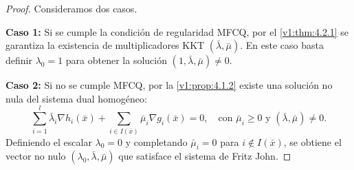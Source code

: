 \begin{proof}
 Consideramos dos casos.
 
 \textbf{Caso 1:} Si se cumple la condición de regularidad MFCQ, por el \cref{v1:thm:4.2.1} se garantiza la existencia de multiplicadores KKT $(\bar{\lambda}, \bar{\mu})$. En este caso basta definir $\lambda_0 = 1$ para obtener la solución $(1, \bar{\lambda}, \bar{\mu}) \neq 0$.
 
 \textbf{Caso 2:} Si no se cumple MFCQ, por la \cref{v1:prop:4.1.2} existe una solución no nula del sistema dual homogéneo:
 \[
 \sum_{i=1}^l \bar{\lambda}_i \nabla h_i(\bar{x}) + \sum_{i \in I(\bar{x})} \bar{\mu}_i \nabla g_i(\bar{x}) = 0, \quad \text{con } \bar{\mu}_i \ge 0 \text{ y } (\bar{\lambda}, \bar{\mu}) \neq 0.
 \]
 Definiendo el escalar $\lambda_0 = 0$ y completando $\bar{\mu}_i = 0$ para $i \notin I(\bar{x})$, se obtiene el vector no nulo $(\lambda_0, \bar{\lambda}, \bar{\mu})$ que satisface el sistema de Fritz John.
\end{proof}

